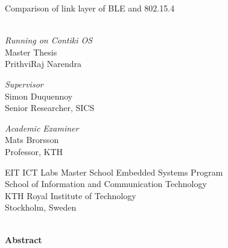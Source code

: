 \begin{titlepage}
\thispagestyle{empty}
\begin{center}

  \vspace{.5cm}
  \huge{Comparison of link layer of BLE and 802.15.4}\tiny{}\\
  \vspace{0.3cm}
  \\
  \vspace{0.2cm}
  \LARGE{\textit{Running on Contiki OS}}\\
  \vspace{2cm}
  \Large{Master Thesis}\\
  

  \vspace{2cm}		
  \LARGE{PrithviRaj Narendra}
  \vspace{3.5cm} 
  
  \large{\textit{Supervisor}}\\
  \LARGE{Simon Duquennoy}\\
  \vspace{0.2cm}
  \Large{Senior Researcher, SICS}\\
  \vspace{2cm}
  
  \large{\textit{Academic Examiner}}\\
  \LARGE{Mats Brorsson}\\
  \vspace{0.2cm}
  \Large{Professor, KTH}\\
  \vspace{2cm}

\large
EIT ICT Labs Master School Embedded Systems Program\\
School of Information and Communication Technology\\
KTH Royal Institute of Technology\\
Stockholm, Sweden\\
\vspace{1cm}
\\
\end{center} 

\end{titlepage}

\newpage\null\thispagestyle{empty}\newpage

\thispagestyle{plain}
{}
\huge{\textbf{Abstract}} \\
\normalsize \\


